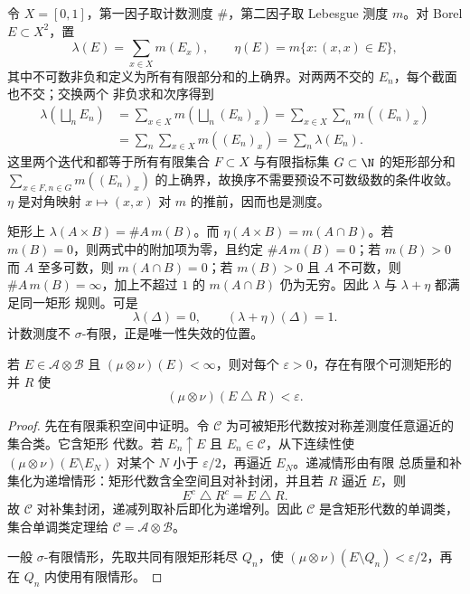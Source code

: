 \begin{example}\label{ex:2-3-2-5}
令 $X=[0,1]$，第一因子取计数测度 $\#$，第二因子取 Lebesgue 测度 $m$。对 Borel
$E\subset X^2$，置
\[
 \lambda(E)=\sum_{x\in X}m(E_x),\qquad
 \eta(E)=m\{x:(x,x)\in E\},
\]
其中不可数非负和定义为所有有限部分和的上确界。对两两不交的 $E_n$，每个截面也不交；交换两个
非负求和次序得到
\[
\begin{aligned}
 \lambda\!\left(\bigsqcup_nE_n\right)
 &=\sum_{x\in X}m\!\left(\bigsqcup_n(E_n)_x\right)
  =\sum_{x\in X}\sum_nm((E_n)_x)\\
 &=\sum_n\sum_{x\in X}m((E_n)_x)
  =\sum_n\lambda(E_n).
\end{aligned}
\]
这里两个迭代和都等于所有有限集合
$F\subset X$ 与有限指标集 $G\subset\N$ 的矩形部分和
$\sum_{x\in F,n\in G}m((E_n)_x)$ 的上确界，故换序不需要预设不可数级数的条件收敛。
$\eta$ 是对角映射
$x\mapsto(x,x)$ 对 $m$ 的推前，因而也是测度。

矩形上
$\lambda(A\times B)=\#A\,m(B)$。而
$\eta(A\times B)=m(A\cap B)$。若 $m(B)=0$，则两式中的附加项为零，且约定
$\#A\,m(B)=0$；若 $m(B)>0$ 而 $A$ 至多可数，则 $m(A\cap B)=0$；若 $m(B)>0$ 且 $A$
不可数，则 $\#A\,m(B)=\infty$，加上不超过 $1$ 的 $m(A\cap B)$ 仍为无穷。因此
$\lambda$ 与 $\lambda+\eta$ 都满足同一矩形
规则。可是
\[
 \lambda(\Delta)=0,\qquad (\lambda+\eta)(\Delta)=1.
\]
计数测度不 $\sigma$-有限，正是唯一性失效的位置。
\end{example}

\begin{proposition}[矩形近似]\label{proposition:2-3-2-3}
若 $E\in\mathcal A\otimes\mathcal B$ 且
$(\mu\otimes\nu)(E)<\infty$，则对每个 $\varepsilon>0$，存在有限个可测矩形的并 $R$ 使
\[
 (\mu\otimes\nu)(E\mathbin\triangle R)<\varepsilon.
\]
\end{proposition}

\begin{proof}
先在有限乘积空间中证明。令 $\mathcal C$ 为可被矩形代数按对称差测度任意逼近的集合类。它含矩形
代数。若 $E_n\uparrow E$ 且 $E_n\in\mathcal C$，从下连续性使
$(\mu\otimes\nu)(E\setminus E_N)$ 对某个 $N$ 小于 $\varepsilon/2$，再逼近 $E_N$。递减情形由有限
总质量和补集化为递增情形：矩形代数含全空间且对补封闭，并且若 $R$ 逼近 $E$，则
\[
 E^c\mathbin\triangle R^c=E\mathbin\triangle R.
\]
故 $\mathcal C$ 对补集封闭，递减列取补后即化为递增列。因此 $\mathcal C$ 是含矩形代数的单调类，集合单调类定理给
$\mathcal C=\mathcal A\otimes\mathcal B$。

一般 $\sigma$-有限情形，先取共同有限矩形耗尽 $Q_n$，使
$(\mu\otimes\nu)(E\setminus Q_n)<\varepsilon/2$，再在 $Q_n$ 内使用有限情形。
\end{proof}

